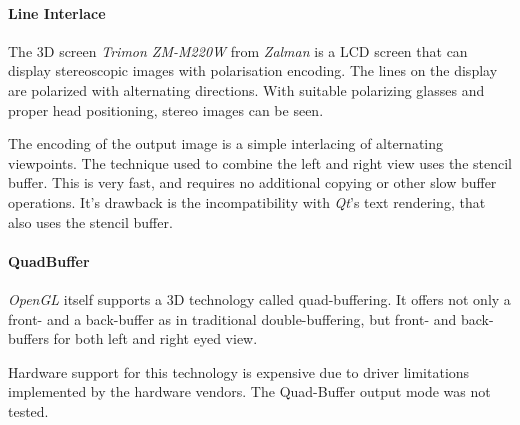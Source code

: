 \paragraph{Line Interlace}
The 3D screen \textit{Trimon ZM-M220W} from \textit{Zalman} is a LCD screen that can display stereoscopic images with polarisation encoding.
The lines on the display are polarized with alternating directions.
With suitable polarizing glasses and proper head positioning, stereo images can be seen.

The encoding of the output image is a simple interlacing of alternating viewpoints.
The technique used to combine the left and right view uses the stencil buffer.
This is very fast, and requires no additional copying or other slow buffer operations.
It's drawback is the incompatibility with \textit{Qt}'s text rendering, that also uses the stencil buffer.

\paragraph{QuadBuffer}
\textit{OpenGL} itself supports a 3D technology called quad-buffering.
It offers not only a front- and a back-buffer as in traditional double-buffering,
but front- and back-buffers for both left and right eyed view.

Hardware support for this technology is expensive due to driver limitations implemented by the hardware vendors.
The Quad-Buffer output mode was not tested.

